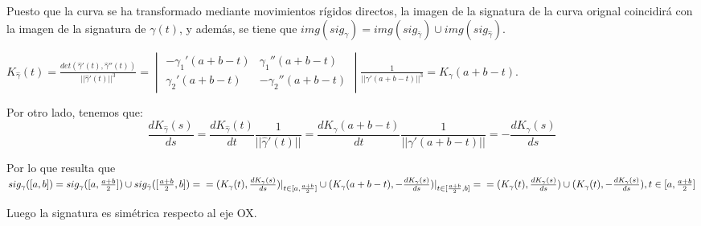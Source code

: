 \documentclass[12pt,a4paper]{article}
\begin{document}
\begin{enumerate}
  Puesto que la curva se ha transformado mediante movimientos rígidos
  directos, la imagen de la signatura de la curva orignal coincidirá con la
  imagen de la signatura de $\gamma(t)$, y además, se tiene que
  $img(sig_{\gamma}) = img(sig_{\bar{\gamma}}) \cup
  img(sig_{\hat{\gamma}})$.

  $K_{\hat{\gamma}}(t) = \frac{det(\hat{\gamma}'(t),
    \hat{\gamma}''(t))}{||\hat{\gamma}'(t)||^{3}} = 
  \begin{vmatrix}
    -\gamma_{1}'(a+b-t) & \gamma_{1}''(a+b-t) \\
    \gamma_{2}'(a+b-t) & -\gamma_{2}''(a+b-t) 
  \end{vmatrix} \frac{1}{||\gamma'(a+b-t)||^{3}} =K_{\gamma}(a+b-t).$

  Por otro lado, tenemos que:\\
  $$\frac{dK_{\hat{\gamma}}(s)}{ds} =
  \frac{dK_{\hat{\gamma}}(t)}{dt} \frac{1}{||\hat{\gamma}'(t)||} =
  \frac{dK_{\gamma}(a+b-t)}{dt} \frac{1}{||\gamma'(a+b-t)||} = -
  \frac{dK_\gamma(s)}{ds}$$

  Por lo que resulta que\\
  $sig_{\gamma}([a,b]) = sig_{\gamma}([a,
  \frac{a+b}{2}]) \cup sig_{\hat{\gamma}}([\frac{a+b}{2}, b]) = \\=
  (K_{\gamma}(t), \frac{dK_{\gamma}(s)}{ds})|_{t\in[a, \frac{a+b}{2}]} \cup
  (K_{\gamma}(a+b-t), - \frac{dK_{\gamma}(s)}{ds})|_{t\in[\frac{a+b}{2},
    b]} =\\= (K_{\gamma}(t), \frac{dK_{\gamma}(s)}{ds}) \cup
  (K_{\gamma}(t), - \frac{dK_{\gamma}(s)}{ds}), t\in[a, \frac{a+b}{2}]$
  
  Luego la signatura es simétrica respecto al eje OX.\\



\end{enumerate}
\end{document}
